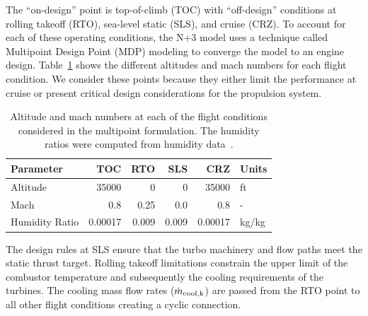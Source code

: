 \documentclass[conf]{new-aiaa}
\begin{document}
The ``on-design'' point is top-of-climb (TOC) with ``off-design'' conditions at rolling takeoff (RTO), sea-level static (SLS), and cruise (CRZ).
To account for each of these operating conditions, the N+3 model uses a technique called Multipoint Design Point (MDP) modeling to converge the model to an engine design.
Table~\ref{tab:flight_conds} shows the different altitudes and mach numbers for each flight condition.
We consider these points because they either limit the performance at cruise or present critical design considerations for the propulsion system.
\begin{table}[hbt!]
  \centering
  \caption{Altitude and mach numbers at each of the flight conditions considered in the multipoint formulation.
    The humidity ratios were computed from humidity data~\cite{Kalnay1996}.
  }
  \begin{tabular}{l r r r r l}
    \hline
    Parameter      & TOC     & RTO   & SLS   & CRZ     & Units      \\
    \hline
    Altitude       & 35000   & 0     & 0     & 35000   & \si{ft}    \\
    Mach           & 0.8     & 0.25  & 0.0   & 0.8     & -          \\
    Humidity Ratio & 0.00017 & 0.009 & 0.009 & 0.00017 & \si{kg/kg} \\
    \hline
  \end{tabular}
  \label{tab:flight_conds}
\end{table}
The design rules at SLS ensure that the turbo machinery and flow paths meet the static thrust target.
Rolling takeoff limitations constrain the upper limit of the combustor temperature and subsequently the cooling requirements of the turbines.
The cooling mass flow rates ($\dot{m}_{\rm{cool},k}$) are passed from the RTO point to all other flight conditions creating a cyclic connection.
\end{document}
